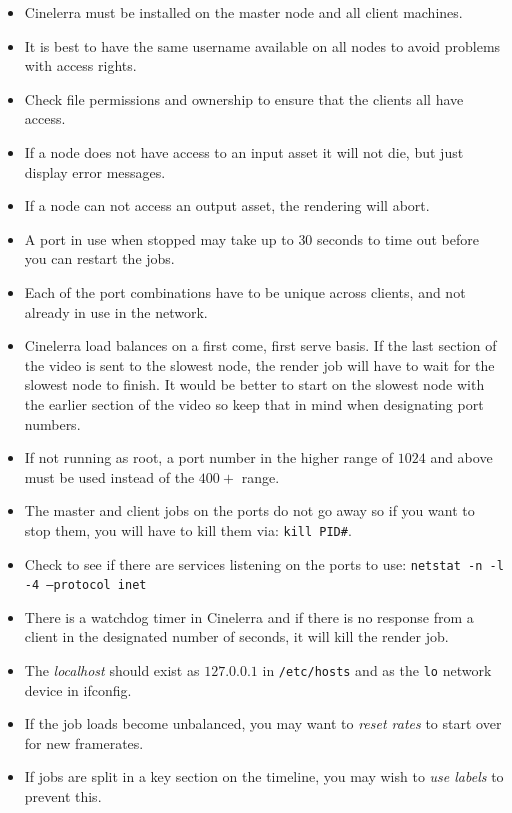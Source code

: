 \begin{itemize}
    \item Cinelerra must be installed on the master node and all client machines.
    \item It is best to have the same username available on all nodes to avoid problems with access rights.
    \item Check file permissions and ownership to ensure that the clients all have access.
    \item If a node does not have access to an input asset it will not die, but just display error messages.
    \item If a node can not access an output asset, the rendering will abort.
    \item A port in use when stopped may take up to $30$ seconds to time out before you can restart the jobs.
    \item Each of the port combinations have to be unique across clients, and not already in use in the network.
    \item Cinelerra load balances on a first come, first serve basis.  If the last section of the video is sent to the
    slowest node, the render job will have to wait for the slowest node to finish.  It would be better to 
    start on the slowest node with the earlier section of the video so keep that in mind when designating
    port numbers.
    \item If not running as root, a port number in the higher range of $1024$ and above must be used instead of
    the $400+$ range.
    \item The master and client jobs on the ports do not go away so if you want to stop them, you will have to
    kill them via: \texttt{kill PID\#}.
    \item Check to see if there are services listening on the ports to use:  \texttt{netstat -n -l -4 --protocol inet}
    \item There is a watchdog timer in Cinelerra and if there is no response from a client in the designated
    number of seconds, it will kill the render job.
    \item The \textit{localhost} should exist as $127.0.0.1$ in \texttt{/etc/hosts} and as the \texttt{lo} network device in ifconfig.
    \item If the job loads become unbalanced, you may want to \textit{reset rates} to start over for new framerates.
    \item If jobs are split in a key section on the timeline, you may wish to \textit{use labels} to prevent this.

\end{itemize}
